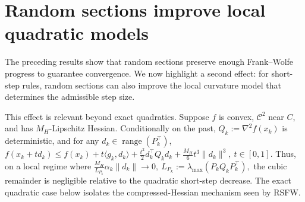 \documentclass{article}
\DeclareMathOperator{\range}{range}
\newtheorem{theorem}{Theorem}
\begin{document}



\section{Random sections improve local quadratic models}
\label{sec:quadratic_ellipsoid_gain}

The preceding results show that random sections preserve enough Frank--Wolfe
progress to guarantee convergence. We now highlight a second effect: for
short-step rules, random sections can also improve the local curvature model
that determines the admissible step size.

This effect is relevant beyond exact quadratics. Suppose \(f\) is convex, \(\mathcal{C}^2\)
near \(C\), and has \(M_H\)-Lipschitz Hessian. Conditionally on the past,
\(Q_k:=\nabla^2 f(x_k)\) is deterministic, and for any
\(d_k\in\range(P_k^\top)\), 
$
f(x_k+t d_k)
\le
f(x_k)
+t\langle g_k,d_k\rangle
+\frac{t^2}{2}d_k^\top Q_kd_k
+\frac{M_H}{6}t^3\|d_k\|^3,\ t\in[0,1].
$
Thus, on a local regime where
$
\frac{M_H}{L_{P_k}}\alpha_k\|d_k\|\to0,\ 
L_{P_k}:=\lambda_{\max}(P_kQ_kP_k^\top),
$
the cubic remainder is negligible relative to the quadratic short-step decrease.
The exact quadratic case below isolates the compressed-Hessian mechanism seen
by RSFW.
\end{document}
